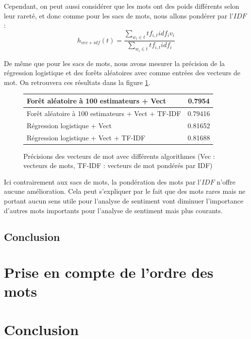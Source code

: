 \documentclass{article}
\begin{document}
Cependant, on peut aussi considérer que les mots ont des poids différents selon leur rareté, et donc comme pour les sacs de mots, nous allons pondérer par l'$IDF$ :
$$
h_{vec+idf}(t) = \frac{\sum_{w_{i} \in t}{tf_{i, t}idf_{i}v_{i}}}{\sum_{w_{i} \in t}{tf_{i, t}idf_{i}}}
$$

De même que pour les sacs de mots, nous avons mesurer la précision de la régression logistique et des forêts aléatoires avec comme entrées des vecteurs de mot. On retrouvera ces résultats dans la figure \ref{results_vec}.

\begin{figure}
\begin{center}
\begin{tabular}{|l|c|}
	\hline
	Forêt aléatoire à 100 estimateurs + Vect & 0.7954 \\
	\hline
	Forêt aléatoire à 100 estimateurs + Vect + TF-IDF & 0.79416 \\
	\hline
	Régression logistique + Vect & 0.81652 \\
	\hline
	Régression logistique + Vect + TF-IDF & 0.81688 \\
	\hline
\end{tabular}
\caption{Précisions des vecteurs de mot avec différents algorithmes (Vec : vecteurs de mots, TF-IDF : vecteurs de mot pondérés par IDF)}
\label{results_vec}
\end{center}
\end{figure}

Ici contrairement aux sacs de mots, la pondération des mots par l'$IDF$ n'offre aucune amélioration. Cela peut s'expliquer par le fait que des mots rares mais ne portant aucun sens utile pour l'analyse de sentiment vont diminuer l'importance d'autres mots importants pour l'analyse de sentiment mais plus courants. 

\subsection{Conclusion}




\section{Prise en compte de l'ordre des mots}

\section{Conclusion}



\end{document}
